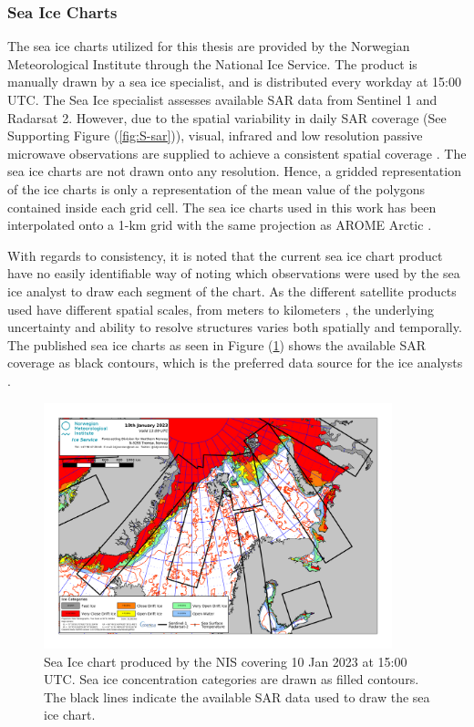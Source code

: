 \documentclass[../main/thesis.tex]{subfiles}
\begin{document}
\subsubsection{Sea Ice Charts}
\label{sec:sea-ice-charts}
The sea ice charts utilized for this thesis are provided by the Norwegian Meteorological Institute through the National Ice Service. The product is manually drawn by a sea ice specialist, and is distributed every workday at 15:00 UTC. The Sea Ice specialist assesses available SAR data from Sentinel 1 and Radarsat 2. However, due to the spatial variability in daily SAR coverage (See Supporting Figure (\ref{fig:S-sar})), visual, infrared and low resolution passive microwave observations are supplied to achieve a consistent spatial coverage \citep{Dinessen2020}. The sea ice charts are not drawn onto any resolution. Hence, a gridded representation of the ice charts is only a representation of the mean value of the polygons contained inside each grid cell. The sea ice charts used in this work has been interpolated onto a 1-km grid with the same projection as AROME Arctic \citep{Mueller2017}.

With regards to consistency, it is noted that the current sea ice chart product have no easily identifiable way of noting which observations were used by the sea ice analyst to draw each segment of the chart. As the different satellite products used have different spatial scales, from meters to kilometers \citep{Dinessen2020}, the underlying uncertainty and ability to resolve structures varies both spatially and temporally. The published sea ice charts as seen in Figure (\ref{fig:icechart}) shows the available SAR coverage as black contours, which is the preferred data source for the ice analysts \citep{Dinessen2020}. 

\begin{figure}
    \centering
    \includegraphics[width=0.9\textwidth]{general_latest}
    \caption{\label{fig:icechart}Sea Ice chart produced by the NIS covering 10 Jan 2023 at 15:00 UTC. Sea ice concentration categories are drawn as filled contours. The black lines indicate the available SAR data used to draw the sea ice chart.}
\end{figure}
\end{document}
